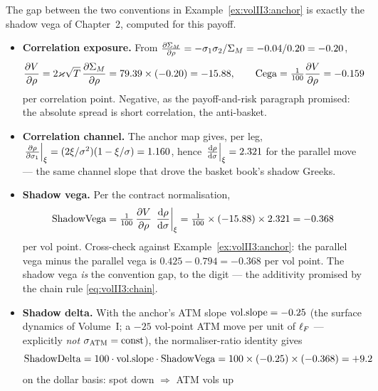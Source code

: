 \begin{example}\label{ex:volII3:shadow}
The gap between the two conventions in Example~\ref{ex:volII3:anchor} is
exactly the shadow vega of Chapter~2, computed for this payoff.
\begin{itemize}[itemsep=0.2em]
\item \textbf{Correlation exposure.} From
      $\frac{\partial \Sigma_M}{\partial \rho} = -\sigma_1\sigma_2/\Sigma_M = -0.04/0.20 = -0.20$,
      \begin{equation}\label{eq:volII3:cegaanchor}
      \frac{\partial V}{\partial \rho} = 2\varkappa\sqrt{T}\,\frac{\partial \Sigma_M}{\partial \rho}
      = 79.39 \times (-0.20) = -15.88,
      \qquad
      \mathrm{Cega} = \tfrac{1}{100}\frac{\partial V}{\partial \rho} = -0.159
      \end{equation}
      per correlation point. Negative, as the payoff-and-risk paragraph
      promised: the absolute spread is short correlation, the anti-basket.
\item \textbf{Correlation channel.} The anchor map gives, per leg,
      $\left.\frac{\partial \rho}{\partial \sigma_1}\right|_{\xi}
      = (2\xi/\sigma^2)(1 - \xi/\sigma) = 1.160$, hence
      $\left.\frac{\mathrm{d} \rho}{\mathrm{d} \sigma}\right|_{\xi} = 2.321$ for the parallel move ---
      the same channel slope that drove the basket book's shadow Greeks.
\item \textbf{Shadow vega.} Per the contract normalisation,
      \begin{equation}\label{eq:volII3:shvegaanchor}
      \mathrm{ShadowVega} = \tfrac{1}{100}\,\frac{\partial V}{\partial \rho}\,
      \left.\frac{\mathrm{d} \rho}{\mathrm{d} \sigma}\right|_{\xi}
      = \tfrac{1}{100} \times (-15.88) \times 2.321 = -0.368
      \end{equation}
      per vol point. Cross-check against
      Example~\ref{ex:volII3:anchor}: the parallel \stickycvc{} vega minus the
      parallel \stickyrho{} vega is $0.425 - 0.794 = -0.368$ per vol point.
      The shadow vega \emph{is} the convention gap, to the digit --- the
      additivity promised by the chain rule \eqref{eq:volII3:chain}.
\item \textbf{Shadow delta.} With the anchor's ATM slope
      $\mathrm{vol.slope} = -0.25$ (the surface dynamics of Volume~I; a $-25$
      vol-point ATM move per unit of $\ell_F$ --- explicitly \emph{not}
      $\sigma_{\mathrm{ATM}} = \text{const}$), the normaliser-ratio identity gives
      \begin{equation}\label{eq:volII3:shdeltaanchor}
      \mathrm{ShadowDelta} = 100 \cdot \mathrm{vol.slope} \cdot \mathrm{ShadowVega}
      = 100 \times (-0.25) \times (-0.368) = +9.2
      \end{equation}
      on the dollar basis: spot down $\Rightarrow$ ATM vols up

\end{itemize}
\end{example}
